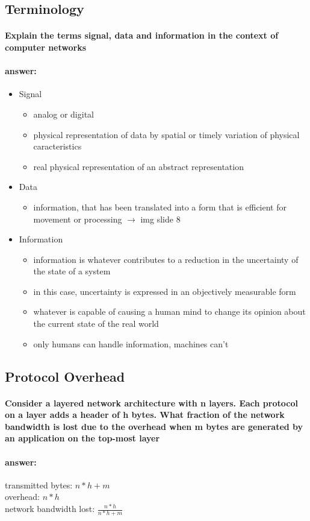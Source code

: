 \documentclass[a4paper,11pt]{article}
\begin{document}
  \subsection{Terminology}
 \paragraph{Explain the terms signal, data and information in the context of computer networks}
 \paragraph{answer:}
 \begin{itemize}
 	\item Signal
 	\begin{itemize}
 		\item  analog or digital
 		\item  physical representation of data by spatial or timely variation of physical caracteristics
 		\item  real physical representation of an abstract representation
 	\end{itemize}
 
 	\item Data
 	\begin{itemize}
 		\item  information, that has been translated into a form that is efficient for movement or processing
 		$\rightarrow$ img slide 8 
 	\end{itemize}
 
 	\item Information
 	\begin{itemize}
 		\item  information is whatever contributes to a reduction in the uncertainty of the state of a system
 		\item  in this case, uncertainty is expressed in an objectively measurable form
 		\item  whatever is capable of causing a human mind to change its opinion about the current state of the real world
 		\item  only humans can handle information, machines can't
 	\end{itemize}
 \end{itemize}
 
  \subsection{Protocol Overhead}
 \paragraph{Consider a layered network architecture with n layers. Each protocol on a layer adds a header of h bytes. What fraction of the network bandwidth is lost due to the overhead when m bytes are generated by an application on the top-most layer}
 \paragraph{answer:} 

 transmitted bytes: $n * h + m$ \\
 overhead: $n * h$ \\
 network bandwidth lost: $\frac{n * h}{n * h + m}$
 

 
\end{document}
